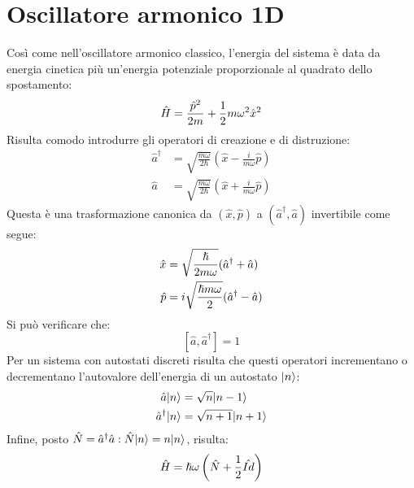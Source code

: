 \section{Oscillatore armonico 1D}
Così come nell'oscillatore armonico classico, l'energia del sistema è data da energia cinetica più un'energia potenziale proporzionale al quadrato dello spostamento:
\[
    \hat{H} = \frac{\hat p^2}{2m} + \frac{1}{2} m \omega^2 \hat x^2
\]
Risulta comodo introdurre gli operatori di creazione e di distruzione:
\begin{align}
    \hat a^\dag &= \sqrt{\frac{m \omega}{2 \hbar}} \left( \hat x - \frac{i}{m \omega} \hat p \right) \\
    \hat a &= \sqrt{\frac{m \omega}{2 \hbar}} \left( \hat x + \frac{i}{m \omega} \hat p \right)
\end{align}
Questa è una trasformazione canonica da $(\hat x, \hat p)$ a $(\hat a^\dag, \hat a)$ invertibile come segue:
\begin{align}
    \hat x &= \sqrt{\frac{\hslash}{2m\omega}}(\hat a^\dag + \hat a) \\
    \hat p &= i\sqrt{\frac{\hslash m\omega}{2}}(\hat a^\dag - \hat a)
\end{align}
Si può verificare che:
\[
    \left[ \hat a, \hat a^\dag \right] = 1
\]
Per un sistema con autostati discreti risulta che questi operatori incrementano o decrementano l'autovalore dell'energia di un autostato $|n\rangle$:
\begin{align*}
    \hat a |n\rangle &= \sqrt{n} |n-1\rangle \\
    \hat a^\dag |n\rangle &= \sqrt{n+1} |n+1\rangle
\end{align*}
Infine, posto $\hat{N} = \hat a^\dag \hat a: \hat{N}|n\rangle = n|n\rangle$, risulta:
\[
    \hat{H} = \hslash\omega \left( \hat N + \frac{1}{2}\hat{Id} \right)
\]

